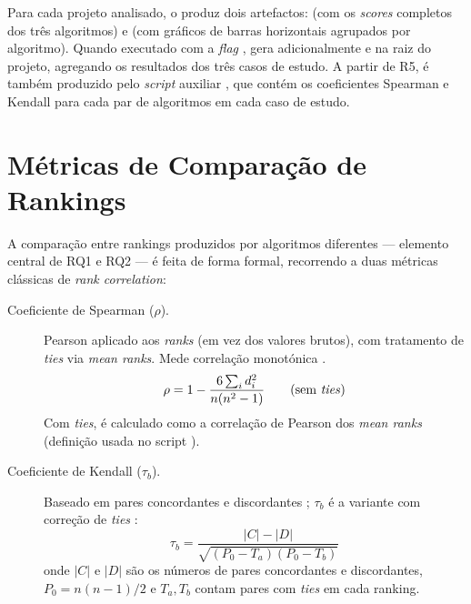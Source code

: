Para cada projeto analisado, o  produz dois
artefactos:  (com os \emph{scores}
completos dos três algoritmos) e  (com
gráficos de barras horizontais agrupados por algoritmo). Quando
executado com a \emph{flag} , gera adicionalmente
 e 
na raiz do projeto, agregando os resultados dos três casos de estudo.
A partir de R5, é também produzido 
pelo \emph{script} auxiliar ,
que contém os coeficientes Spearman e Kendall para cada par de
algoritmos em cada caso de estudo.

\section{Métricas de Comparação de Rankings}
\label{sec:metricas}

A comparação entre rankings produzidos por algoritmos diferentes ---
elemento central de RQ1 e RQ2 --- é feita de forma formal,
recorrendo a duas métricas clássicas de \emph{rank correlation}:

\begin{description}
    \item[Coeficiente de Spearman ($\rho$).] Pearson aplicado aos
        \emph{ranks} (em vez dos valores brutos), com tratamento de
        \emph{ties} via \emph{mean ranks}. Mede correlação monotónica
        \parencite{spearman1904}.
        \[
            \rho = 1 - \frac{6 \sum_i d_i^2}{n(n^2 - 1)}
            \qquad \text{(sem \emph{ties})}
        \]
        Com \emph{ties}, é calculado como a correlação de Pearson dos
        \emph{mean ranks} (definição usada no script
        ).

    \item[Coeficiente de Kendall ($\tau_b$).] Baseado em pares
        concordantes e discordantes \parencite{kendall1938};
        $\tau_b$ é a variante com correção de \emph{ties}
        \parencite{goodman1954}:
        \[
            \tau_b = \frac{|C| - |D|}
                {\sqrt{(P_0 - T_a)(P_0 - T_b)}}
        \]
        onde $|C|$ e $|D|$ são os números de pares concordantes e
        discordantes, $P_0 = n(n-1)/2$ e $T_a, T_b$ contam pares com
        \emph{ties} em cada ranking.
\end{description}


